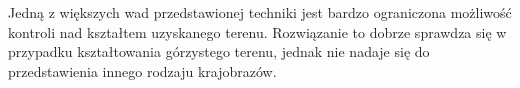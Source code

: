 Jedną z większych wad przedstawionej techniki jest bardzo ograniczona możliwość kontroli nad kształtem uzyskanego terenu. Rozwiązanie to dobrze sprawdza się w przypadku kształtowania górzystego terenu, jednak nie nadaje się do przedstawienia innego rodzaju krajobrazów.



